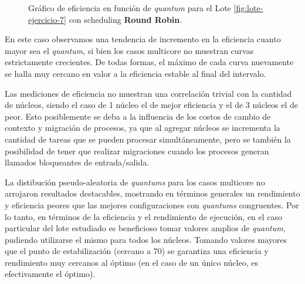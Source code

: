 \begin{figure}[h!t]
  \centering
  \caption{Gráfico de eficiencia en función de \textit{quantum} para el Lote \ref{fig:lote-ejercicio-7} con scheduling \textbf{Round Robin}.}
  \label{fig:eficiencia-comparacion}
\end{figure}

En este caso observamos una tendencia de incremento en la eficiencia cuanto mayor sea el \textit{quantum}, si bien los casos multicore no muestran curvas estrictamente crecientes. De todas formas, el máximo de cada curva nuevamente se halla muy cercano en valor a la eficiencia estable al final del intervalo.

Las mediciones de eficiencia no muestran una correlación trivial con la cantidad de núcleos, siendo el caso de 1 núcleo el de mejor eficiencia y el de 3 núcleos el de peor. Esto posiblemente se deba a la influencia de los costos de cambio de contexto y migración de procesos, ya que al agregar núcleos se incrementa la cantidad de tareas que se pueden procesar simultáneamente, pero se también la posibilidad de tener que realizar migraciones cuando los procesos generan llamados bloqueantes de entrada/salida.

La distibución pseudo-aleatoria de \textit{quantums} para los casos multicore no arrojaron resultados destacables, mostrando en términos generales un rendimiento y eficiencia peores que las mejores configuraciones con \textit{quantums} congruentes. Por lo tanto, en términos de la eficiencia y el rendimiento de ejecución, en el caso particular del lote estudiado es beneficioso tomar valores amplios de \textit{quantum}, pudiendo utilizarse el mismo para todos los núcleos. Tomando valores mayores que el punto de estabilización (cercano a $70$) se garantiza una eficiencia y rendimiento muy cercanos al óptimo (en el caso de un único núcleo, es efectivamente el óptimo).

